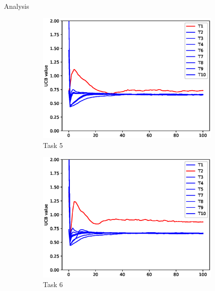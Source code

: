 \begin{frame}{Analysis}
    \begin{figure}
        \begin{subfigure}[b]{0.32\linewidth}
            \includegraphics[width=\linewidth]{figure/ucb/5.eps}
            \caption{Task 5}
        \end{subfigure}
        \begin{subfigure}[b]{0.32\linewidth}
            \includegraphics[width=\linewidth]{figure/ucb/6.eps}
            \caption{Task 6}
        \end{subfigure}
        \begin{subfigure}[b]{0.32\linewidth}

\end{subfigure}
\end{figure}
\end{frame}

